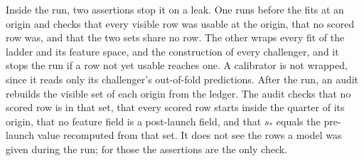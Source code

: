 \documentclass[sigconf,nonacm]{acmart}
\begin{document}
Inside the run, two assertions stop it on a leak. One runs before the fits at an origin and checks that every visible row was usable at the origin, that no scored row was, and that the two sets share no row. The other wraps every fit of the ladder and its feature space, and the construction of every challenger, and it stops the run if a row not yet usable reaches one. A calibrator is not wrapped, since it reads only its challenger's out-of-fold predictions. After the run, an audit rebuilds the visible set of each origin from the ledger. The audit checks that no scored row is in that set, that every scored row starts inside the quarter of its origin, that no feature field is a post-launch field, and that $s_\ast$ equals the pre-launch value recomputed from that set. It does not see the rows a model was given during the run; for those the assertions are the only check.

\end{document}
